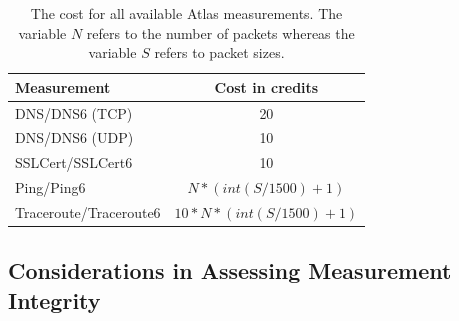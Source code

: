 %
%
%

% 

\begin{table}[t]
\centering
\begin{tabular}{lc}
\textbf{Measurement} & \textbf{Cost in credits} \\
\hline 
DNS\slash DNS6 (TCP) & 20\\ 
DNS\slash DNS6 (UDP) & 10\\ 
SSLCert\slash SSLCert6 & 10 \\
Ping\slash Ping6 & $N * (int(S/1500)+1)$\\
Traceroute\slash Traceroute6 & $ 10*N*(int(S/1500)+1)$\\[1ex] 
\hline 
\end{tabular} 
\caption{The cost for all available Atlas measurements.  The variable $N$
refers to the number of packets whereas the variable $S$ refers to packet
sizes.}
\label{tab:cost} 
\end{table}

\subsection{Considerations in Assessing Measurement Integrity}


